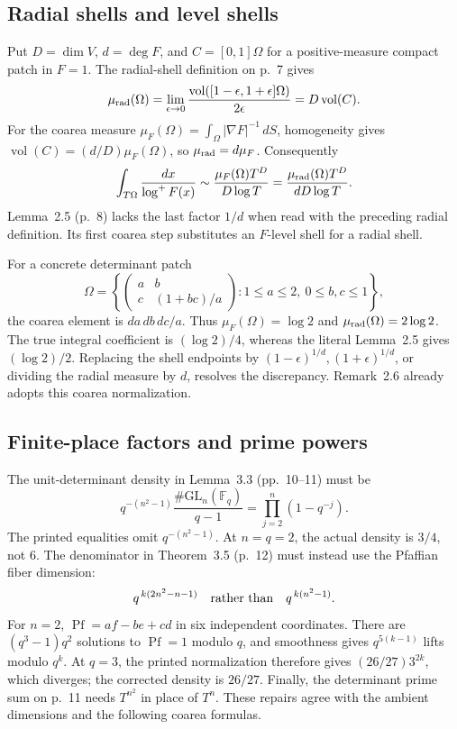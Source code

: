 \documentclass[10pt]{article}
\begin{document}
\subsection*{Radial shells and level shells}
Put \(D=\dim V\), \(d=\deg F\), and \(C=[0,1]\Omega\) for a positive-measure compact patch in \(F=1\). The radial-shell definition on p. 7 gives \[\mu_{\rm rad}(\Omega)
 =\lim_{\epsilon\to0}
   \frac{\operatorname{vol}([1-\epsilon,1+\epsilon]\Omega)}{2\epsilon}
 =D\operatorname{vol}(C).\] For the coarea measure \(\mu_F(\Omega)=\int_\Omega|\nabla F|^{-1}\,dS\), homogeneity gives \(\operatorname{vol}(C)=(d/D)\mu_F(\Omega)\), so \(\mu_{\rm rad}=d\mu_F\). Consequently \[\int_{T\Omega}\frac{dx}{\log^+F(x)}
 \sim\frac{\mu_F(\Omega)T^D}{D\log T}
 =\frac{\mu_{\rm rad}(\Omega)T^D}{dD\log T}.\] Lemma 2.5 (p. 8) lacks the last factor \(1/d\) when read with the preceding radial definition. Its first coarea step substitutes an \(F\)-level shell for a radial shell.\par
For a concrete determinant patch \[\Omega=\left\{\begin{pmatrix}a&b\\ c&(1+bc)/a\end{pmatrix}:
           1\le a\le2,\ 0\le b,c\le1\right\},\] the coarea element is \(da\,db\,dc/a\). Thus \(\mu_F(\Omega)=\log2\) and \(\mu_{\rm rad}(\Omega)=2\log2\). The true integral coefficient is \((\log2)/4\), whereas the literal Lemma 2.5 gives \((\log2)/2\). Replacing the shell endpoints by \((1-\epsilon)^{1/d},(1+\epsilon)^{1/d}\), or dividing the radial measure by \(d\), resolves the discrepancy. Remark 2.6 already adopts this coarea normalization.\par
\subsection*{Finite-place factors and prime powers}
The unit-determinant density in Lemma 3.3 (pp. 10–11) must be \[q^{-(n^2-1)}\frac{\#\mathrm{GL}_n(\mathbb F_q)}{q-1}
       =\prod_{j=2}^n(1-q^{-j}).\] The printed equalities omit \(q^{-(n^2-1)}\). At \(n=q=2\), the actual density is \(3/4\), not \(6\). The denominator in Theorem 3.5 (p. 12) must instead use the Pfaffian fiber dimension: \[q^{\,k(2n^2-n-1)}
             \quad\hbox{rather than}\quad q^{\,k(n^2-1)}.\] For \(n=2\), \(\operatorname{Pf}=af-be+cd\) in six independent coordinates. There are \((q^3-1)q^2\) solutions to \(\operatorname{Pf}=1\) modulo \(q\), and smoothness gives \(q^{5(k-1)}\) lifts modulo \(q^k\). At \(q=3\), the printed normalization therefore gives \((26/27)3^{2k}\), which diverges; the corrected density is \(26/27\). Finally, the determinant prime sum on p. 11 needs \(T^{n^2}\) in place of \(T^n\). These repairs agree with the ambient dimensions and the following coarea formulas.\par
\end{document}

